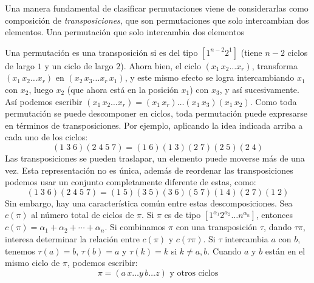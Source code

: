   Una manera fundamental de clasificar permutaciones%
  viene de considerarlas como composición de \emph{transposiciones},
  que son permutaciones que solo intercambian dos elementos.%
	     {Una permutación que solo intercambia dos elementos}

  Una permutación es una transposición
  si es del tipo \([1^{n - 2} 2^1]\)
  (tiene \(n - 2\) ciclos de largo \(1\) y un ciclo de largo \(2\)).
  Ahora bien,
  el ciclo \((x_1 \, x_2 \dotso x_r)\),
  transforma \((x_1 \, x_2 \dotso x_r)\)
  en \((x_2 \, x_3 \dotso x_r \, x_1)\),
  y este mismo efecto se logra intercambiando \(x_1\) con \(x_2\),
  luego \(x_2\)
  (que ahora está en la posición \(x_1\))
  con \(x_3\),
  y así sucesivamente.
  Así podemos escribir
  \((x_1 \, x_2 \dotso x_r)
      = (x_1 \, x_r) \dotso (x_1 \, x_3) (x_1 \, x_2)\).
  Como toda permutación se puede descomponer en ciclos,
  toda permutación puede expresarse en términos de transposiciones.
  Por ejemplo,
  aplicando la idea indicada arriba a cada uno de los ciclos:
  \begin{equation*}
    (1\;3\;6)(2\;4\;5\;7) = (1\;6) (1\;3) (2\;7) (2\;5) (2\;4)
  \end{equation*}
  Las transposiciones se pueden traslapar,
  un elemento puede moverse más de una vez.
  Esta representación no es única,
  además de reordenar las transposiciones
  podemos usar un conjunto completamente diferente de estas,
  como:
  \begin{equation*}
    (1\;3\;6)(2\;4\;5\;7)
      = (1\;5) (3\;5) (3\;6) (5\;7) (1\;4) (2\;7) (1\;2)
  \end{equation*}
  Sin embargo,
  hay una característica común entre estas descomposiciones.
  Sea \(c(\pi)\) al número total de ciclos de \(\pi\).
  Si \(\pi\)
  es de tipo \([1^{\alpha_1} 2^{\alpha_2} \dotso n^{\alpha_n}]\),
  entonces \(c(\pi) = \alpha_1 + \alpha_2 + \dotsb + \alpha_n\).
  Si combinamos \(\pi\) con una transposición \(\tau\),
  dando \(\tau \pi\),
  interesa determinar
  la relación entre \(c(\pi)\) y \(c(\tau \pi)\).
  Si \(\tau\) intercambia \(a\) con  \(b\),
  tenemos \(\tau(a) = b\), \(\tau(b) = a\)
  y \(\tau(k) = k\) si \(k \ne a, b\).
  Cuando \(a\) y \(b\) están en el mismo ciclo de \(\pi\),
  podemos escribir:
  \begin{equation*}
    \pi = (a \, x \dotso y \, b \dotso z) \text{\ y otros ciclos}
  \end{equation*}
